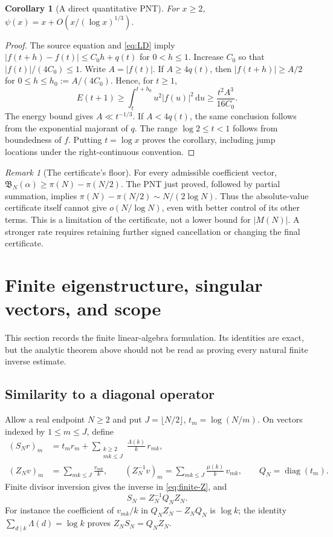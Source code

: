 \documentclass[11pt,letterpaper]{article}
\numberwithin{equation}{section}
\newtheorem{corollary}[theorem]{Corollary}
\theoremstyle{definition}
\theoremstyle{remark}
\newtheorem{remark}[theorem]{Remark}
\newcommand{\dd}{\,\mathrm d}
\DeclareMathOperator{\diag}{diag}
\begin{document}
\begin{corollary}[A direct quantitative PNT]\label{cor:PNT}
For $x\ge2$,
$\psi(x)=x+O(x/(\log x)^{1/3})$.
\end{corollary}
\begin{proof}
The source equation and \eqref{eq:LD} imply
$|f(t+h)-f(t)|\le C_0h+q(t)$ for $0<h\le1$.
Increase $C_0$ so that $|f(t)|/(4C_0)\le1$.
Write $A=|f(t)|$. If $A\ge4q(t)$, then $|f(t+h)|\ge A/2$ for
$0\le h\le h_0:=A/(4C_0)$. Hence, for $t\ge1$,
\[
 E(t+1)\ge\int_t^{t+h_0}u^2|f(u)|^2\dd u
           \ge\frac{t^2A^3}{16C_0}.
\]
The energy bound gives $A\ll t^{-1/3}$. If $A<4q(t)$, the same conclusion
follows from the exponential majorant of $q$.
The range $\log2\le t<1$ follows from boundedness of $f$.
Putting $t=\log x$ proves the corollary, including jump locations under
the right-continuous convention.
\end{proof}

\begin{remark}[The certificate's floor]\label{rem:floor}
For every admissible coefficient vector,
$\mathfrak B_N(\alpha)\ge\pi(N)-\pi(N/2)$.
The PNT just proved, followed by partial summation, implies
$\pi(N)-\pi(N/2)\sim N/(2\log N)$. Thus the absolute-value certificate
itself cannot give $o(N/\log N)$, even with better control of its other
terms. This is a limitation of the certificate, not a lower bound for
$|M(N)|$. A stronger rate requires retaining further signed cancellation
or changing the final certificate.
\end{remark}

\section{Finite eigenstructure, singular vectors, and scope}\label{sec:finite}

This section records the finite linear-algebra formulation. Its identities
are exact, but the analytic theorem above should not be read as proving
every natural finite inverse estimate.

\subsection{Similarity to a diagonal operator}
Allow a real endpoint $N\ge2$ and put $J=\lfloor N/2\rfloor$,
$t_m=\log(N/m)$. On vectors indexed by $1\le m\le J$, define
\begin{align}
 (S_Nr)_m&=t_mr_m+
       \sum_{\substack{k\ge2\\mk\le J}}\frac{\Lambda(k)}k\,r_{mk},
       \label{eq:finite-S}\\
 (Z_Nv)_m&=\sum_{mk\le J}\frac{v_{mk}}k,\qquad
 (Z_N^{-1}v)_m=\sum_{mk\le J}\frac{\mu(k)}k\,v_{mk},\qquad
 Q_N=\diag(t_m).\label{eq:finite-Z}
\end{align}
Finite divisor inversion gives the inverse in \eqref{eq:finite-Z}, and
\begin{equation}\label{eq:similarity}
 S_N=Z_N^{-1}Q_NZ_N.
\end{equation}
For instance the coefficient of $v_{mk}/k$ in
$Q_NZ_N-Z_NQ_N$ is $\log k$; the identity
$\sum_{d\mid k}\Lambda(d)=\log k$ proves $Z_NS_N=Q_NZ_N$.
\end{document}
